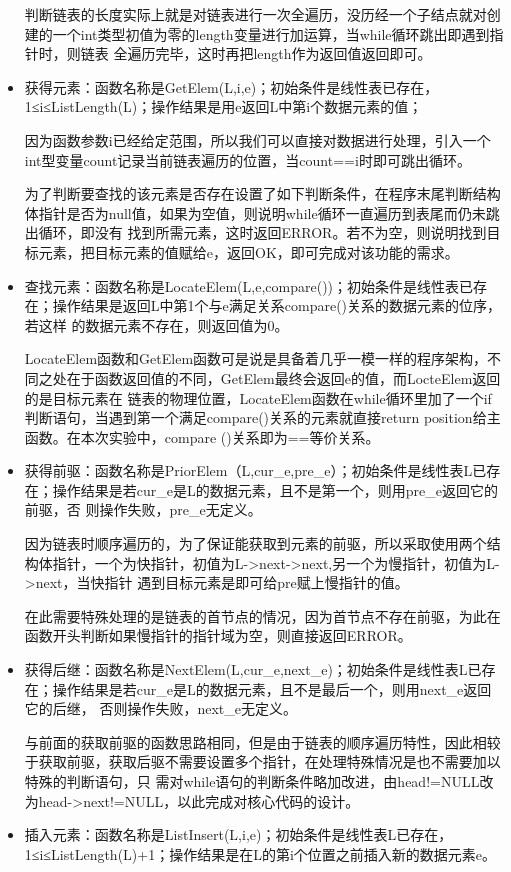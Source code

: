 \documentclass[supercite]{Experimental_Report}
\theoremstyle{definition}
\begin{document}
\begin{itemize}
	      判断链表的长度实际上就是对链表进行一次全遍历，没历经一个子结点就对创建的一个int类型初值为零的length变量进行加运算，当while循环跳出即遇到指针时，则链表
	      全遍历完毕，这时再把length作为返回值返回即可。
	\item 获得元素：函数名称是GetElem(L,i,e)；初始条件是线性表已存在，1≤i≤ListLength(L)；操作结果是用e返回L中第i个数据元素的值；

	      因为函数参数i已经给定范围，所以我们可以直接对数据进行处理，引入一个int型变量count记录当前链表遍历的位置，当count==i时即可跳出循环。

	      为了判断要查找的该元素是否存在设置了如下判断条件，在程序末尾判断结构体指针是否为null值，如果为空值，则说明while循环一直遍历到表尾而仍未跳出循环，即没有
	      找到所需元素，这时返回ERROR。若不为空，则说明找到目标元素，把目标元素的值赋给e，返回OK，即可完成对该功能的需求。
	\item 查找元素：函数名称是LocateElem(L,e,compare())；初始条件是线性表已存在；操作结果是返回L中第1个与e满足关系compare()关系的数据元素的位序，若这样
	      的数据元素不存在，则返回值为0。

	      LocateElem函数和GetElem函数可是说是具备着几乎一模一样的程序架构，不同之处在于函数返回值的不同，GetElem最终会返回e的值，而LocteElem返回的是目标元素在
	      链表的物理位置，LocateElem函数在while循环里加了一个if判断语句，当遇到第一个满足compare()关系的元素就直接return position给主函数。在本次实验中，compare
	      ()关系即为==等价关系。
	\item 获得前驱：函数名称是PriorElem（L,cur\_e,pre\_e）；初始条件是线性表L已存在；操作结果是若cur\_e是L的数据元素，且不是第一个，则用pre\_e返回它的前驱，否
	      则操作失败，pre\_e无定义。

	      因为链表时顺序遍历的，为了保证能获取到元素的前驱，所以采取使用两个结构体指针，一个为快指针，初值为L->next->next,另一个为慢指针，初值为L->next，当快指针
	      遇到目标元素是即可给pre赋上慢指针的值。

	      在此需要特殊处理的是链表的首节点的情况，因为首节点不存在前驱，为此在函数开头判断如果慢指针的指针域为空，则直接返回ERROR。
	\item 获得后继：函数名称是NextElem(L,cur\_e,next\_e)；初始条件是线性表L已存在；操作结果是若cur\_e是L的数据元素，且不是最后一个，则用next\_e返回它的后继，
	      否则操作失败，next\_e无定义。

	      与前面的获取前驱的函数思路相同，但是由于链表的顺序遍历特性，因此相较于获取前驱，获取后驱不需要设置多个指针，在处理特殊情况是也不需要加以特殊的判断语句，只
	      需对while语句的判断条件略加改进，由head!=NULL改为head->next!=NULL，以此完成对核心代码的设计。
	\item 插入元素：函数名称是ListInsert(L,i,e)；初始条件是线性表L已存在，1≤i≤ListLength(L)+1；操作结果是在L的第i个位置之前插入新的数据元素e。


\end{itemize}
\end{document}
